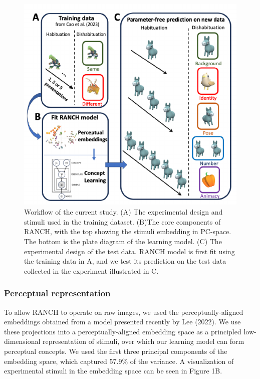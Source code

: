 \documentclass[10pt, letterpaper]{article}
\newenvironment{CodeChunk}{}{}
\begin{document}
\begin{CodeChunk}
\begin{figure}[t]

{\centering \includegraphics{figs/design_fig-1} 

}

\caption[Workflow of the current study]{Workflow of the current study. (A) The experimental design and stimuli used in the training dataset. (B)The core components of RANCH, with the top showing the stimuli embedding in PC-space. The bottom is the plate diagram of the learning model. (C) The experimental design of the test data. RANCH model is first fit using the training data in A, and we test its prediction on the test data collected in the experiment illustrated in C.}\label{fig:design_fig}
\end{figure}
\end{CodeChunk}

\hypertarget{perceptual-representation}{%
\subsubsection{Perceptual
representation}\label{perceptual-representation}}

To allow RANCH to operate on raw images, we used the
perceptually-aligned embeddings obtained from a model presented recently
by Lee (2022). We use these projections into a perceptually-aligned
embedding space as a principled low-dimensional representation of
stimuli, over which our learning model can form perceptual concepts. We
used the first three principal components of the embedding space, which
captured 57.9\% of the variance. A visualization of experimental stimuli
in the embedding space can be seen in Figure 1B.
\end{document}
